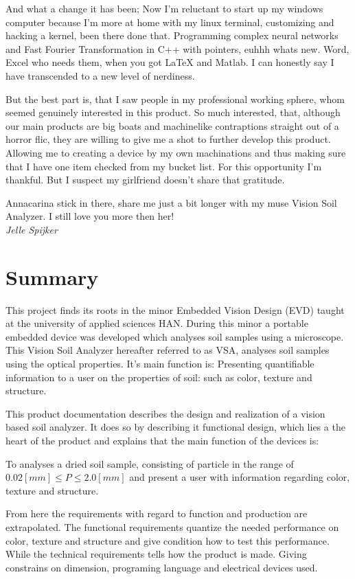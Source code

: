 \documentclass[11pt,fleqn,,a4paper,twoside,openright]{book}
\begin{document}
And what a change it has been; Now I'm reluctant to start up my windows computer because I'm more at home with my linux terminal, customizing and hacking a kernel, been there done that. Programming complex neural networks and Fast Fourier Transformation in C++ with pointers, euhhh whats new. Word, Excel who needs them, when you got \LaTeX\xspace and Matlab. I can honestly say I have transcended to a new level of nerdiness.

But the best part is, that I saw people in my professional working sphere, whom seemed genuinely interested in this product. So much interested, that, although our main products are big boats and machinelike contraptions straight out of a horror flic, they are willing to give me a shot to further develop this product. Allowing me to creating a device by my own machinations and thus making sure that I have one item checked from my bucket list. For this opportunity I'm thankful. But I suspect my girlfriend doesn't share that gratitude.
\\
\begin{center}
	Annacarina stick in there, share me just a bit longer with my muse Vision Soil Analyzer. I still love you more then her!\\
	\textit{Jelle Spijker}
\end{center}

\chapter*{Summary}
This project finds its roots in the minor Embedded Vision Design (EVD) taught at the university of applied sciences HAN. During this minor a portable embedded device was developed which analyses soil samples using a microscope. This Vision Soil Analyzer hereafter referred to as VSA, analyses soil samples using the optical properties. It's main function is: Presenting quantifiable information to a user on the properties of soil: such as color, texture and structure.

This product documentation describes the design and realization of a vision based soil analyzer. It does so by describing it functional design, which lies a the heart of the product and explains that the main function of the devices is:
\begin{sBox}
	To analyses a dried soil sample, consisting of particle in the range of $ 0.02 [mm] \leq P \leq 2.0 [mm] $ and present a user with information regarding color, texture and structure.
\end{sBox}
From here the requirements with regard to function and production are extrapolated. The functional requirements quantize the needed performance on color, texture and structure and give condition how to test this performance. While the technical requirements tells how the product is made. Giving constrains on dimension, programing language and electrical devices used.
\end{document}
